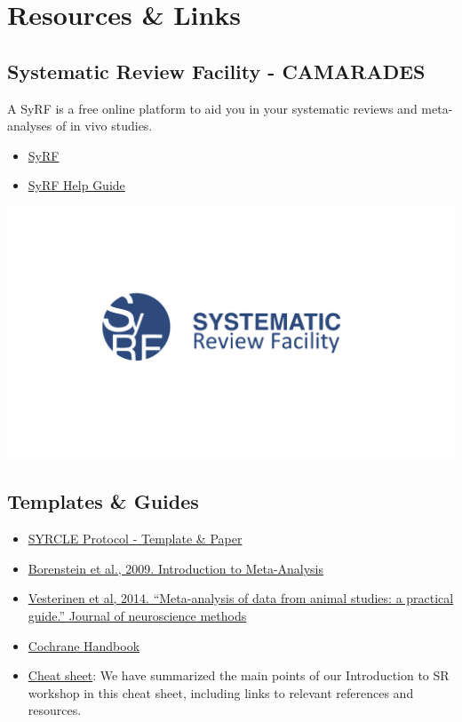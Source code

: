 \documentclass[
]{book}
\providecommand{\tightlist}{%
  \setlength{\itemsep}{0pt}\setlength{\parskip}{0pt}}
\begin{document}
\chapter{Resources \& Links}\label{resources-links}

\section{Systematic Review Facility - CAMARADES}\label{systematic-review-facility---camarades}

A SyRF is a free online platform to aid you in your systematic reviews and meta-analyses of in vivo studies.

\begin{itemize}
\tightlist
\item
  \href{https://syrf.org.uk/}{SyRF}
\item
  \href{https://help.syrf.org.uk/}{SyRF Help Guide}
\end{itemize}

\includegraphics{figs/syrf-logo.png}

\section{Templates \& Guides}\label{templates-guides}

\begin{itemize}
\tightlist
\item
  \href{https://onlinelibrary.wiley.com/doi/epdf/10.1002/ebm2.7}{SYRCLE Protocol - Template \& Paper}
\item
  \href{https://onlinelibrary.wiley.com/doi/book/10.1002/9780470743386}{Borenstein et al., 2009. Introduction to Meta-Analysis}
\item
  \href{https://doi.org/10.1016/j.jneumeth.2013.09.010}{Vesterinen et al, 2014. ``Meta-analysis of data from animal studies: a practical guide.'' Journal of neuroscience methods}
\item
  \href{https://training.cochrane.org/handbook/current}{Cochrane Handbook}
\item
  \href{CheatSheet_IntroSRworkshop_2023.pdf}{Cheat sheet}: We have summarized the main points of our Introduction to SR workshop in this cheat sheet, including links to relevant references and resources.
\end{itemize}
\end{document}
